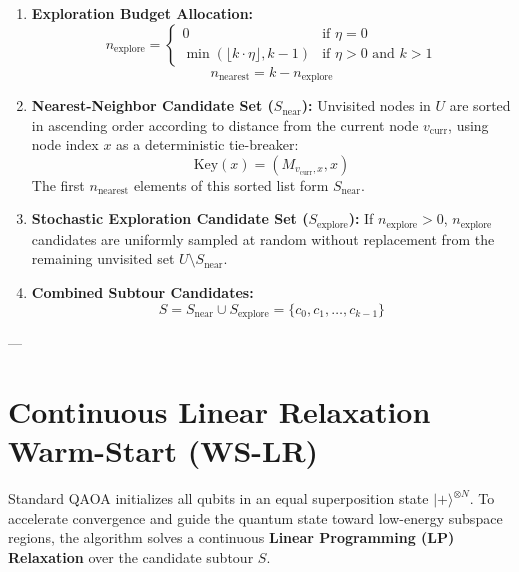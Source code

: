\documentclass[11pt,a4paper]{article}
\begin{document}
\begin{enumerate}
    \item \textbf{Exploration Budget Allocation:}
    \begin{equation}
    n_{\text{explore}} = \begin{cases} 0 & \text{if } \eta = 0 \\ \min\left(\lfloor k \cdot \eta \rfloor, k - 1\right) & \text{if } \eta > 0 \text{ and } k > 1 \end{cases}
    \end{equation}
    \begin{equation}
    n_{\text{nearest}} = k - n_{\text{explore}}
    \end{equation}

    \item \textbf{Nearest-Neighbor Candidate Set ($S_{\text{near}}$):}
    Unvisited nodes in $U$ are sorted in ascending order according to distance from the current node $v_{\text{curr}}$, using node index $x$ as a deterministic tie-breaker:
    \begin{equation}
    \text{Key}(x) = \left(M_{v_{\text{curr}}, x}, x\right)
    \end{equation}
    The first $n_{\text{nearest}}$ elements of this sorted list form $S_{\text{near}}$.

    \item \textbf{Stochastic Exploration Candidate Set ($S_{\text{explore}}$):}
    If $n_{\text{explore}} > 0$, $n_{\text{explore}}$ candidates are uniformly sampled at random without replacement from the remaining unvisited set $U \setminus S_{\text{near}}$.

    \item \textbf{Combined Subtour Candidates:}
    \begin{equation}
    S = S_{\text{near}} \cup S_{\text{explore}} = \{c_0, c_1, \dots, c_{k-1}\}
    \end{equation}
\end{enumerate}

---

\section{Continuous Linear Relaxation Warm-Start (WS-LR)}

Standard QAOA initializes all qubits in an equal superposition state $|+\rangle^{\otimes N}$. To accelerate convergence and guide the quantum state toward low-energy subspace regions, the algorithm solves a continuous \textbf{Linear Programming (LP) Relaxation} over the candidate subtour $S$.
\end{document}
